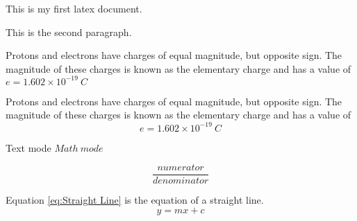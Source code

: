 \documentclass[12pt]{report}
\begin{document}
	This is my first latex document.
	
	This is the second paragraph.
	
	\lipsum
	
	Protons and electrons have charges of equal magnitude, but opposite sign. The magnitude of these charges is known as the elementary charge and has a value of $e=1.602\times10^{-19}\ C$
	
	Protons and electrons have charges of equal magnitude, but opposite sign. The magnitude of these charges is known as the elementary charge and has a value of $$e=1.602\times10^{-19}\ C$$
	
	Text mode $Math\ mode$
	
	$$\frac{numerator}{denominator}$$
	
	Equation \ref{eq:Straight Line} is the equation of a straight line.
	\begin{equation} \label{eq:Staright Line}
	y=mx+c
	\end{equation}
\end{document}
